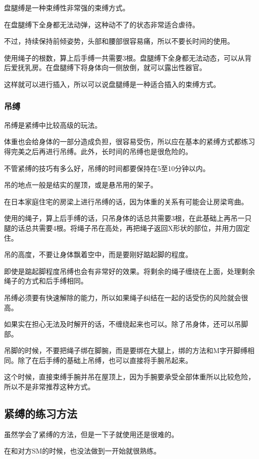 \documentclass[12pt,UTF8]{ctexbook}
\begin{document}
盘腿缚是一种束缚性非常强的束缚方式。

在盘腿缚下全身都无法动弹，这种动不了的状态非常适合虐待。

不过，持续保持前倾姿势，头部和腰部很容易痛，所以不要长时间的使用。

使用绳子的根数，算上后手缚一共需要3根。盘腿缚下全身都无法动态，可以从背后爱抚乳房。在盘腿缚下将身体向一侧放倒，就可以露出性器官。

这样就可以进行插入，所以可以说盘腿缚是一种适合插入的束缚方式。

\subsubsection{吊缚}

吊缚是紧缚中比较高级的玩法。

体重也会给身体的一部分造成负担，很容易受伤，所以应在基本的紧缚方式都练习得完美之后再进行吊缚。此外，长时间的吊缚也是很危险的。

不管紧缚的技巧有多么好，吊缚的时间都要保持在5至10分钟以内。

吊的地点一般是结实的屋顶，或是悬吊用的架子。

在日本家庭住宅的房梁上进行吊缚的话，因为体重的关系有可能会让房梁弯曲。

使用的绳子，算上后手缚的话，只吊身体的话总共需要3根，在此基础上再吊一只腿的话总共需要4根。将绳子吊在高处，再把绳子返回X形状的部位，并用力固定住。

吊的高度，不要让身体飘着空中，而是要刚好踮起脚的程度。

即使是踮起脚程度吊缚也会有非常好的效果。将剩余的绳子缠绕在上面，处理剩余绳子的方式和后手缚相同。

吊缚必须要有快速解除的能力，所以如果绳子纠结在一起的话受伤的风险就会很高。

如果实在担心无法及时解开的话，不缠绕起来也可以。除了吊身体，还可以吊脚部。

吊脚的时候，不要把绳子绑在脚腕，而是要绑在大腿上，绑的方法和M字开脚缚相同。除了在后手缚的基础上吊缚，也可以直接将手腕吊起来。

这个时候，直接束缚手腕并吊在屋顶上，因为手腕要承受全部体重所以比较危险，所以不是非常推荐这种方式。

\subsection{紧缚的练习方法}

虽然学会了紧缚的方法，但是一下子就使用还是很难的。

在和对方SM的时候，也没法做到一开始就很熟练。
\end{document}

